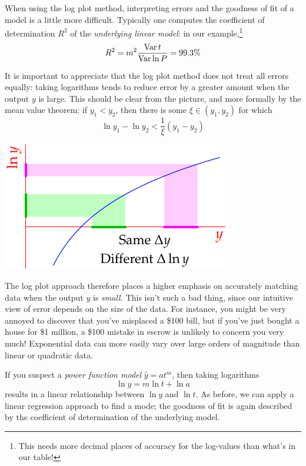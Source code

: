 When using the log plot method, interpreting errors and the goodness of fit of a model is a little more difficult. Typically one computes the coefficient of determination $R^2$ of the \emph{underlying linear model}: in our example,\footnote{This needs more decimal places of accuracy for the log-values than what's in our table!}
\[R^2=m^2\frac{\operatorname{Var} t}{\operatorname{Var}\ln P}=99.3\%\]
\begin{minipage}[t]{0.6\linewidth}\vspace{0pt}
It is important to appreciate that the log plot method does not treat all errors equally: taking logarithms tends to reduce error by a greater amount when the output  $y$ is large. This should be clear from the picture, and more formally by the mean value theorem: if $y_1<y_2$, then there is some $\xi\in(y_1,y_2)$ for which 
\[\ln y_1-\ln y_2<\frac 1{\xi}(y_1-y_2)\]
\end{minipage}
\hfill
\begin{minipage}[t]{0.39\linewidth}\vspace{0pt}
	\flushright\includegraphics{logerror}
\end{minipage}
\medbreak

The log plot approach therefore places a higher emphasis on accurately matching data when the output $y$ is \emph{small.} This isn't such a bad thing, since our intuitive view of error depends on the size of the data. For instance, you might be very annoyed to discover that you've misplaced a \$100 bill, but if you've just bought a house for \$1 million, a \$100 mistake in escrow is unlikely to concern you very much! Exponential data can more easily vary over large orders of magnitude than linear or quadratic data. 

\goodbreak


If you suspect a \emph{power function model} $\hat y=at^m$, then taking logarithms
\[\ln\hat y=m\ln t+\ln a\]
results in a linear relationship between $\ln y$ and $\ln t$. As before, we can apply a linear regression approach to find a mode; the goodness of fit is again described by the coefficient of determination of the underlying model. 




